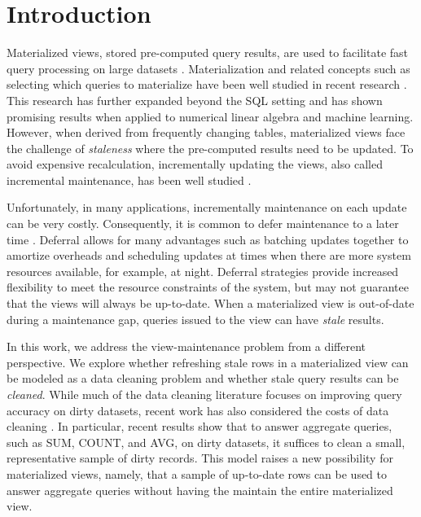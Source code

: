\section{Introduction}
Materialized views, stored pre-computed query results, are used to facilitate fast query processing on large datasets \cite{gupta1995maintenance, chirkova2011materialized, halevy2001answering}.
Materialization and related concepts such as selecting which queries to materialize
have been well studied in recent research \cite{zaharia2012resilient,lefevre2014opportunistic, bailis2014scalable, perez2014history}.
This research has further expanded beyond the SQL setting \cite{nikolic2014linview, zhang2014mat} and 
has shown promising results when applied to numerical linear algebra and machine learning.
However, when derived from frequently changing tables,
materialized views face the challenge of \emph{staleness} where the pre-computed results need to be updated.
To avoid expensive recalculation, incrementally updating the views,
also called incremental maintenance, has been well studied \cite{gupta1995maintenance, chirkova2011materialized}.

Unfortunately, in many applications, incrementally maintenance on each update can be very costly. 
Consequently, it is common to defer maintenance to a later time \cite{chirkova2011materialized, zhou2007lazy}.
Deferral allows for many advantages such as batching updates together to amortize overheads and scheduling updates at times when there are more system resources available, for example, at night.
Deferral strategies provide increased flexibility to meet the resource constraints of the system, but may not guarantee that the views will always be up-to-date.
When a materialized view is out-of-date during a maintenance gap, queries issued to the view can have \emph{stale} results. 

In this work, we address the view-maintenance problem from a different perspective.
We explore whether refreshing stale rows in a materialized view can be modeled as a data cleaning problem and whether stale query results can be \emph{cleaned}.
While much of the data cleaning literature focuses on improving query accuracy on dirty datasets,
recent work has also considered the costs of data cleaning \cite{wang1999sample}.
In particular, recent results show that to answer aggregate queries, such as SUM, COUNT, and AVG, on dirty datasets, it suffices to clean a small, representative sample of dirty records.
This model raises a new possibility for materialized views, namely, that a sample of up-to-date rows can be used to answer aggregate queries without having the maintain the entire materialized view.


